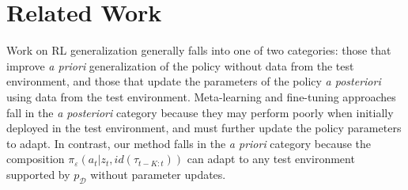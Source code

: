 \documentclass{article}
\newcommand{\cA}{\mathcal{A}}
\newcommand{\cS}{\mathcal{S}}
\newcommand{\idfn}{id}
\newcommand{\idset}{\mathcal{D}}
\newcommand{\obvar}{z}
\newcommand{\idpdf}{p_{\idset}}
\newcommand{\latset}{\mathcal{E}}
\newcommand{\latvar}{\varepsilon}
\begin{document}

\section{Related Work}
Work on RL generalization generally falls into one of two categories: those that improve \emph{a priori} generalization of the policy without data from the test environment,
and those that update the parameters of the policy \emph{a posteriori} using data from the test environment.
Meta-learning and fine-tuning approaches fall in the \emph{a posteriori} category
because they may perform poorly when initially deployed in the test environment,
and must further update the policy parameters to adapt.
In contrast, our method falls in the \emph{a priori} category
because the composition $\pi_\latvar(a_t|\obvar_t,\idfn(\tau_{t-K:t}))$ can adapt to any test environment supported by $\idpdf$ without parameter updates.
\end{document}
